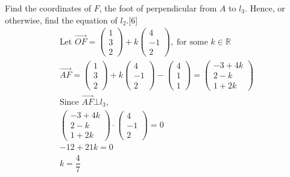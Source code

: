 \documentclass[12pt, a4 paper]{article}
\begin{document}
\begin{outline}[enumerate]
					\color{black}
					\2	Find the coordinates of $F$, the foot of perpendicular from $A$ to ${l_3}$. Hence, or otherwise, find the equation of ${l_2}$.\hfill[6]
					\color{blue}
					\[\begin{array}{l}{\textrm{Let }}\overrightarrow {OF}  = \left( {\begin{array}{*{20}{c}}1\\3\\2\end{array}} \right) + k\left( {\begin{array}{*{20}{c}}4\\{ - 1}\\2\end{array}} \right),\;{\textrm{for some }}k \in \mathbb{R}\\\overrightarrow {AF}  = \left( {\begin{array}{*{20}{c}}1\\3\\2\end{array}} \right) + k\left( {\begin{array}{*{20}{c}}4\\{ - 1}\\2\end{array}} \right) - \left( {\begin{array}{*{20}{c}}4\\1\\1\end{array}} \right) = \left( {\begin{array}{*{20}{c}}{ - 3 + 4k}\\{2 - k}\\{1 + 2k}\end{array}} \right)\\{\textrm{Since }}\overrightarrow {AF}  \bot {l_3},\\\left( {\begin{array}{*{20}{c}}{ - 3 + 4k}\\{2 - k}\\{1 + 2k}\end{array}} \right) \cdot \left( {\begin{array}{*{20}{c}}4\\{ - 1}\\2\end{array}} \right) = 0\\ - 12 + 21k = 0\\k = \dfrac{4}{7}\\\end{array}\]

\end{outline}
\end{document}
